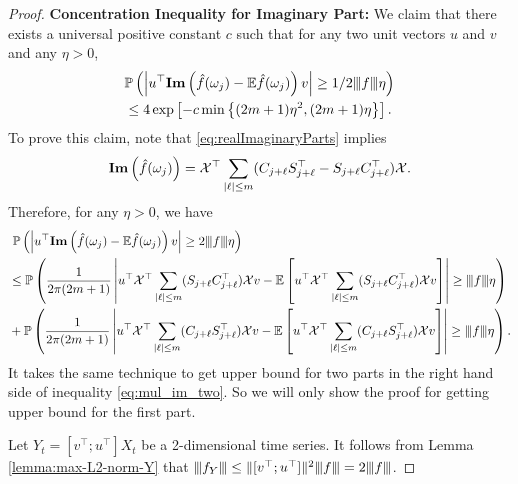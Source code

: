 \begin{proof}
\noindent \textbf{Concentration Inequality for Imaginary Part: } We claim that there exists a universal positive constant $c$ such that for any two  unit vectors $u$ and $v$ and any $\eta > 0$,
\begin{equation}
\begin{aligned}
& \mathbb{P}\left(\left|u^\top \mathrm{\bf{Im}}\left(\hat{f}(\omega_j) - \mathbb{E}\hat{f}(\omega_j)\right)v\right|\ge 1/2{\left\vert\kern-0.25ex\left\vert\kern-0.25ex\left\vert f \right\vert\kern-0.25ex\right\vert\kern-0.25ex\right\vert}\eta \right) \\
& \le 4\exp \left[ - c\min \left\{(2m+1)\eta^2,(2m+1)\eta \right\} \right].\nonumber
\end{aligned}
\end{equation}
To prove this claim, note that \eqref{eq:realImaginaryParts} implies
\begin{equation}
\mathrm{\bf{Im}}\left(\hat{f}(\omega_j)\right) = \mathcal{X}^\top\sum_{|\ell|\le m}(C_{j+\ell}S_{j+\ell}^\top - S_{j+\ell}C_{j+\ell}^\top)\mathcal{X} .\nonumber
\end{equation}
Therefore, for any $\eta > 0$, we have 
\begin{equation}
\label{eq:mul_im_two}
\begin{aligned}
&~ \mathbb{P}\left(\left|u^\top \mathrm{\bf{Im}}\left(\hat{f}(\omega_j) - \mathbb{E}\hat{f}(\omega_j)\right)v\right|\ge 2{\left\vert\kern-0.25ex\left\vert\kern-0.25ex\left\vert f \right\vert\kern-0.25ex\right\vert\kern-0.25ex\right\vert} \eta \right)  \\
& \le \mathbb{P}\left(\frac{1}{2\pi(2m+1)}\left|u^\top \mathcal{X}^\top\sum_{|\ell|\le m}(S_{j+\ell}C_{j+\ell}^\top)\mathcal{X}  v - \mathbb{E}\left[u^\top \mathcal{X}^\top\sum_{|\ell|\le m}(S_{j+\ell}C_{j+\ell}^\top)\mathcal{X}  v\right]\right|\ge {\left\vert\kern-0.25ex\left\vert\kern-0.25ex\left\vert f \right\vert\kern-0.25ex\right\vert\kern-0.25ex\right\vert} \eta \right) \\
&+\mathbb{P}\left(\frac{1}{2\pi(2m+1)}\left|u^\top \mathcal{X}^\top\sum_{|\ell|\le m}(C_{j+\ell}S_{j+\ell}^\top)\mathcal{X}  v - \mathbb{E}\left[ u^\top \mathcal{X}^\top\sum_{|\ell|\le m}(C_{j+\ell}S_{j+\ell}^\top)\mathcal{X}  v\right]\right|\ge {\left\vert\kern-0.25ex\left\vert\kern-0.25ex\left\vert f \right\vert\kern-0.25ex\right\vert\kern-0.25ex\right\vert} \eta \right).
\end{aligned}
\end{equation}
It takes the same technique to get upper bound for two parts in the right hand side of inequality  \eqref{eq:mul_im_two}. So we will only show the proof for getting upper bound for the first part. \par 
Let $Y_t = [v^\top ; u^\top ]X_t$ be a 2-dimensional time series. It follows from Lemma \ref{lemma:max-L2-norm-Y} that ${\left\vert\kern-0.25ex\left\vert\kern-0.25ex\left\vert f_Y \right\vert\kern-0.25ex\right\vert\kern-0.25ex\right\vert}\le \|[v^\top; u^\top]\|^2 {\left\vert\kern-0.25ex\left\vert\kern-0.25ex\left\vert f \right\vert\kern-0.25ex\right\vert\kern-0.25ex\right\vert} = 2{\left\vert\kern-0.25ex\left\vert\kern-0.25ex\left\vert f \right\vert\kern-0.25ex\right\vert\kern-0.25ex\right\vert}$. \par 

\end{proof}
